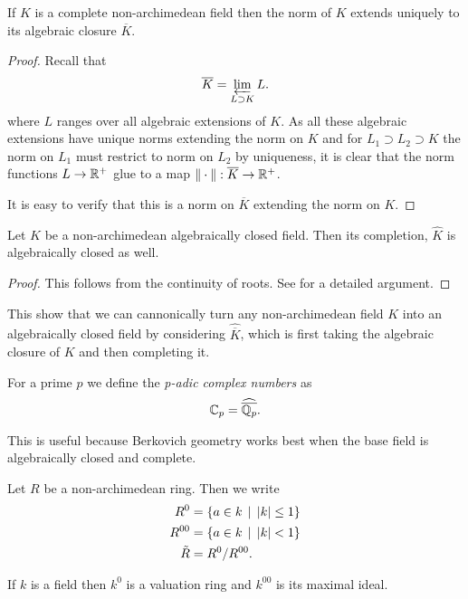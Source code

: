 \begin{corollary}
	If $K$ is a complete non-archimedean field then the norm of  $K$ extends uniquely to its algebraic closure $\overline{K}$.
\end{corollary}
\begin{proof}
	Recall that \[
	\overline{K} = \varprojlim_{L \supset K} L
	.\] 
	where $L$ ranges over all algebraic extensions of $K$. 
	As all these algebraic extensions have unique norms extending  the norm on $K$ and for $L_1 \supset L_2 \supset K$ the norm on  $L_1$ must restrict to norm on $L_2$ by uniqueness, it is clear that the norm functions $L \to \mathbb{R}^{+}$ glue to a map $\|\cdot \|: \overline{K} \to \mathbb{R}^{+}$. 

	It is easy to verify that this is a norm on $\overline{K}$ extending the norm on $K$. 
\end{proof}

\begin{theorem}
	Let $K$ be a non-archimedean algebraically closed field. 
	Then its completion, $\widehat K$ is algebraically closed as well. 
\end{theorem}
\begin{proof}
	This follows from the continuity of roots. See \cite[][lem A.6]{boschLecturesFormalRigid2014} for a detailed argument. 
\end{proof}

This show that we can cannonically turn any non-archimedean field $K$ into an algebraically closed field by considering $\widehat{\overline{K}}$, which is first taking the algebraic closure of $K$ and then completing it. 

\begin{definition}
	For a prime $p$ we define the \emph{p-adic complex numbers} as \[
	\mathbb{C}_p = \widehat{\overline{\mathbb{Q}_p}}
	.\] 
\end{definition}

This is useful because Berkovich geometry works best when the base field is algebraically closed and complete. 

\begin{definition}
	Let $R$ be a non-archimedean ring. Then we write 
	\begin{align*}
		R^{0} &= \{a \in k \st |k| \le 1\}  \\
		R^{00} &=  \{a \in k \st |k| < 1\}  \\
		\tilde R &= R^{0} / R^{00}
	.\end{align*}
\end{definition}
If $k$ is a field then $k^{0}$ is a valuation ring and $ k^{00}$ is its maximal ideal. 

